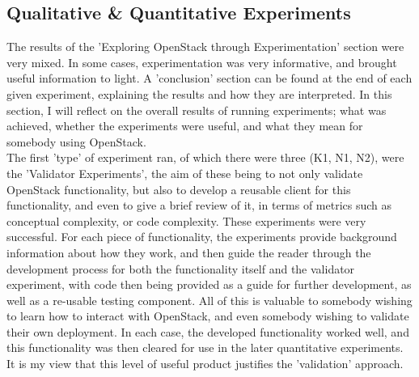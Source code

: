 \subsection{Qualitative \& Quantitative Experiments}
The results of the 'Exploring OpenStack through Experimentation' section were very mixed. In some cases, experimentation was very informative, and brought useful information to light. A 'conclusion' section can be found at the end of each given experiment, explaining the results and how they are interpreted. In this section, I will reflect on the overall results of running experiments; what was achieved, whether the experiments were useful, and what they mean for somebody using OpenStack. \\
The first 'type' of experiment ran, of which there were three (K1, N1, N2), were the 'Validator Experiments', the aim of these being to not only validate OpenStack functionality, but also to develop a reusable client for this functionality, and even to give a brief review of it, in terms of metrics such as conceptual complexity, or code complexity. These experiments were very successful. For each piece of functionality, the experiments provide background information about how they work, and then guide the reader through the development process for both the functionality itself and the validator experiment, with code then being provided as a guide for further development, as well as a re-usable testing component. All of this is valuable to somebody wishing to learn how to interact with OpenStack, and even somebody wishing to validate their own deployment. In each case, the developed functionality worked well, and this functionality was then cleared for use in the later quantitative experiments.   It is my view that this level of useful product justifies the 'validation' approach.\\
